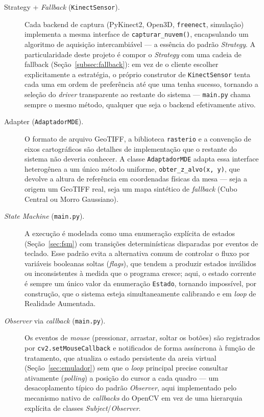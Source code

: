 \begin{description}
    \item[Strategy + \textit{Fallback} (\texttt{KinectSensor}).] Cada
          backend de captura (PyKinect2, Open3D, \texttt{freenect},
          simulação) implementa a mesma interface de
          \texttt{capturar\_nuvem()}, encapsulando um algoritmo de
          aquisição intercambiável — a essência do padrão
          \textit{Strategy}. A particularidade deste projeto é compor
          o \textit{Strategy} com uma cadeia de fallback
          (Seção~\ref{subsec:fallback}): em vez de o cliente escolher
          explicitamente a estratégia, o próprio construtor de
          \texttt{KinectSensor} tenta cada uma em ordem de preferência
          até que uma tenha sucesso, tornando a seleção do
          \textit{driver} transparente ao restante do sistema —
          \texttt{main.py} chama sempre o mesmo método, qualquer que
          seja o backend efetivamente ativo.
    \item[Adapter (\texttt{AdaptadorMDE}).] O formato de arquivo
          GeoTIFF, a biblioteca \texttt{rasterio} e a convenção de
          eixos cartográficos são detalhes de implementação que o
          restante do sistema não deveria conhecer. A classe
          \texttt{AdaptadorMDE} adapta essa interface heterogênea a um
          único método uniforme, \texttt{obter\_z\_alvo(x, y)}, que
          devolve a altura de referência em coordenadas físicas da
          mesa — seja a origem um GeoTIFF real, seja um mapa sintético
          de \textit{fallback} (Cubo Central ou Morro Gaussiano).
    \item[\textit{State Machine} (\texttt{main.py}).] A execução é
          modelada como uma enumeração explícita de estados
          (Seção~\ref{sec:fsm}) com transições determinísticas
          disparadas por eventos de teclado. Esse padrão evita a
          alternativa comum de controlar o fluxo por variáveis
          booleanas soltas (\emph{flags}), que tendem a
          produzir estados inválidos ou inconsistentes à medida que o
          programa cresce; aqui, o estado corrente é sempre um único
          valor da enumeração \texttt{Estado}, tornando impossível,
          por construção, que o sistema esteja simultaneamente
          calibrando e em \textit{loop} de Realidade Aumentada.
    \item[\textit{Observer} via \textit{callback} (\texttt{main.py}).]
          Os eventos de \emph{mouse} (pressionar, arrastar, soltar os
          botões) são registrados por \texttt{cv2.setMouseCallback} e
          notificados de forma assíncrona à função de tratamento, que
          atualiza o estado persistente da areia virtual
          (Seção~\ref{sec:emulador}) sem que o \textit{loop} principal
          precise consultar ativamente (\emph{polling}) a posição do
          cursor a cada quadro — um desacoplamento típico do padrão
          \textit{Observer}, aqui implementado pelo mecanismo nativo
          de \textit{callbacks} do OpenCV em vez de uma hierarquia
          explícita de classes \textit{Subject}/\textit{Observer}.
\end{description}


